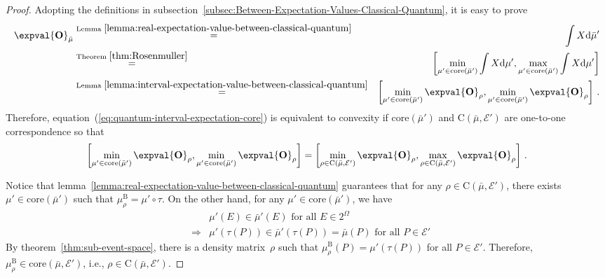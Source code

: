 \documentclass[12pt]{iopart}
\theoremstyle{plain}
\theoremstyle{definition}
\theoremstyle{remark}
\newcommand{\events}{\ensuremath{\mathcal{E}}}
\newcommand{\coreBorn}{\ensuremath{\mathrm{C}}}
\begin{document}
\begin{proof}Adopting the definitions in subsection~\ref{subsec:Between-Expectation-Values-Classical-Quantum},
it is easy to prove
\begin{eqnarray*}
\expval{\mathbf{O}}_{\bar{\mu}} & \stackrel{\textrm{Lemma }\ref{lemma:real-expectation-value-between-classical-quantum}}{=} & \int X\rmd\bar{\mu}'\\
 & \stackrel{\textrm{Theorem }\ref{thm:Rosenmuller}}{=} & \left[\min_{\mu'\in\mathrm{core}\left(\bar{\mu}'\right)}\int X\rmd\mu',\max_{\mu'\in\mathrm{core}\left(\bar{\mu}'\right)}\int X\rmd\mu'\right]\\
 & \stackrel{\textrm{Lemma }\ref{lemma:interval-expectation-value-between-classical-quantum}}{=} & \left[\min_{\mu'\in\mathrm{core}\left(\bar{\mu}'\right)}\expval{\mathbf{O}}_{\rho},\min_{\mu'\in\mathrm{core}\left(\bar{\mu}'\right)}\expval{\mathbf{O}}_{\rho}\right]\,.
\end{eqnarray*}
Therefore, equation~(\ref{eq:quantum-interval-expectation-core})
is equivalent to convexity if $\mathrm{core}\left(\bar{\mu}'\right)$
and $\coreBorn\left(\bar{\mu},\events'\right)$ are one-to-one correspondence
so that
\begin{equation}
\left[\min_{\mu'\in\mathrm{core}\left(\bar{\mu}'\right)}\expval{\mathbf{O}}_{\rho},\min_{\mu'\in\mathrm{core}\left(\bar{\mu}'\right)}\expval{\mathbf{O}}_{\rho}\right]=\left[\min_{\rho\in\coreBorn\left(\bar{\mu},\events'\right)}\expval{\mathbf{O}}_{\rho},\max_{\rho\in\coreBorn\left(\bar{\mu},\events'\right)}\expval{\mathbf{O}}_{\rho}\right]\,.
\end{equation}

Notice that lemma~\ref{lemma:real-expectation-value-between-classical-quantum}
guarantees that for any $\rho\in\coreBorn\left(\bar{\mu},\events'\right)$,
there exists $\mu'\in\mathrm{core}\left(\bar{\mu}'\right)$ such that
$\mu_{\rho}^{\mathrm{B}}=\mu'\circ\tau$. On the other hand, for any
$\mu'\in\mathrm{core}\left(\bar{\mu}'\right)$, we have
\begin{eqnarray}
 &  & \mu'\left(E\right)\in\bar{\mu}'\left(E\right)\textrm{ for all }E\in2^{\Omega}\\
 & \Rightarrow & \mu'\left(\tau\left(P\right)\right)\in\bar{\mu}'\left(\tau\left(P\right)\right)=\bar{\mu}\left(P\right)\textrm{ for all }P\in\events'
\end{eqnarray}
By theorem~\ref{thm:sub-event-space},
there is a density matrix~$\rho$ such that $\mu_{\rho}^{\mathrm{B}}\left(P\right)=\mu'\left(\tau\left(P\right)\right)$
for all $P\in\events'$. Therefore, $\mu_{\rho}^{\mathrm{B}}\in\mathrm{core}\left(\bar{\mu},\events'\right)$,
i.e., $\rho\in\coreBorn\left(\bar{\mu},\events'\right)$.\end{proof}
\end{document}
